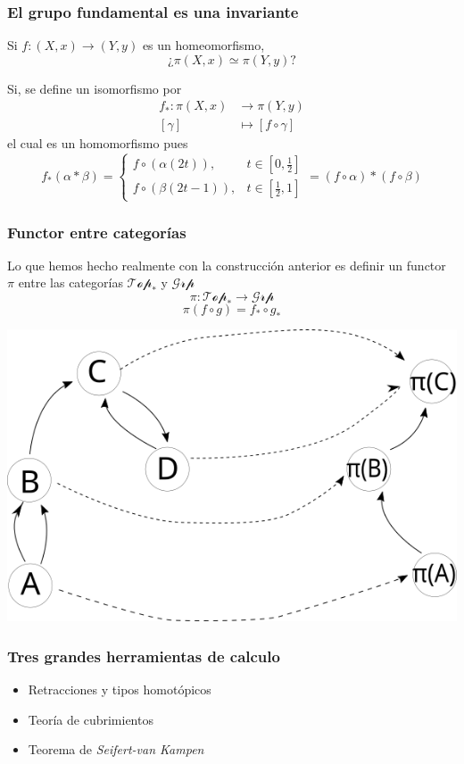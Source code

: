 \documentclass[xetex,mathserif,serif]{beamer}
\newcommand{\vank}{\emph{Seifert-van Kampen} }
\begin{document}
  \begin{frame}
    \frametitle{El grupo fundamental es una invariante}
    Si \(f : (X, x) \to (Y, y) \) es un homeomorfismo, \[¿\pi (X, x)
    \simeq \pi (Y,y)?\]

    \pause

    Si, se define un isomorfismo por
    \begin{align*}
      f_* : \pi (X,x) &\to \pi (Y, y) \\
      [\gamma] &\longmapsto [ f \circ \gamma ]
    \end{align*}
    el cual es un homomorfismo pues
    \[
      f_* \left( \alpha * \beta \right) =
      \begin{cases}
        f \circ \left( \alpha (2t) \right), & t \in [0, \frac 1 2] \\
        f \circ \left( \beta (2t - 1) \right), & t \in [\frac 1 2, 1]
      \end{cases}
      = \left( f \circ \alpha \right) * \left( f \circ \beta \right)
    \]
  \end{frame}

  \begin{frame}
    \frametitle{Functor entre categorías}
    Lo que hemos hecho realmente con la construcción anterior es definir
    un functor \(\pi\) entre las categorías \(\mathscr{Top}_*\) y
    \(\mathscr{Grp}\)
    \[ \pi : \mathscr{Top}_* \to \mathscr{Grp} \]
    \[ \pi (f \circ g) = f_* \circ g_* \]
    \begin{center}
      \includegraphics[scale=0.4]{./imag/categoria.png}
    \end{center}
  \end{frame}
  \begin{frame}
    \frametitle{Tres grandes herramientas de calculo}
    \begin{itemize}
    \item Retracciones y tipos homotópicos
    \item Teoría de cubrimientos
    \item Teorema de \vank
    \end{itemize}
  \end{frame}
\end{document}
